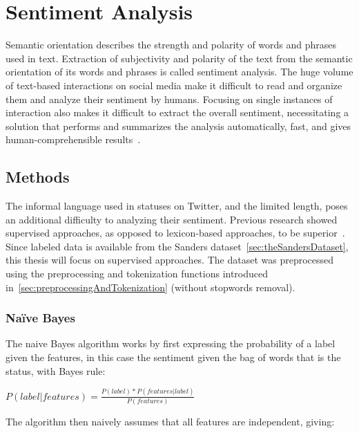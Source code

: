 \chapter{Sentiment Analysis}
\label{ch:sentimentAnalysis}

Semantic orientation describes the strength and polarity of words and phrases used in text.
Extraction of subjectivity and polarity of the text from the semantic orientation of its words and phrases is called sentiment analysis.
The huge volume of text-based interactions on social media make it difficult
to read and organize them and analyze their sentiment by humans.
Focusing on single instances of interaction also makes it difficult to extract the overall sentiment,
necessitating a solution that performs and summarizes the analysis automatically, fast, and gives human-comprehensible results~\cite{Sarlan2014}.

\section{Methods}
\label{sec:methods}

The informal language used in statuses on Twitter, and the limited length, poses an additional difficulty
to analyzing their sentiment.
Previous research showed supervised approaches, as opposed to lexicon-based approaches, to be superior~\cite{Sarlan2014}.
Since labeled data is available from the Sanders dataset~\ref{sec:theSandersDataset},
this thesis will focus on supervised approaches.
The dataset was preprocessed using the preprocessing and tokenization functions introduced in~\ref{sec:preprocessingAndTokenization} (without stopwords removal).

\subsection{Na\"{i}ve Bayes}
\label{subsec:naivebayes}

The naive Bayes algorithm works by first expressing the probability of a label given the features,
in this case the sentiment given the bag of words that is the status, with Bayes rule:

\begin{math}
    P(label|features) = \frac{P(label)*P(features|label)}{P(features)}
\end{math}

The algorithm then naively assumes that all features are independent, giving:

